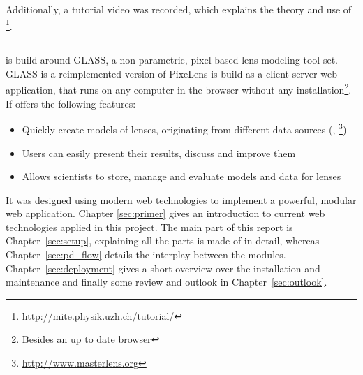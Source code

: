 Additionally, a tutorial video was recorded, which explains the theory and use of \spl\footnote{\protect\url{http://mite.physik.uzh.ch/tutorial/}}.



\subsection{\spl}

\spl is build around GLASS\cite{glass-jc}, a non parametric, pixel based lens modeling tool set.
GLASS is a reimplemented version of PixeLens\cite{pixelens}
%
\spl is build as a client-server web application, that runs on any computer in the browser without any installation\footnote{Besides an up to date browser}.
If offers the following features:
\begin{itemize}
  \item Quickly create models of lenses, originating from different data sources (\sw, \ml \footnote{\protect\url{http://www.masterlens.org}})
  \item Users can easily present their results, discuss and improve them
  \item Allows scientists to store, manage and evaluate models and data for lenses
\end{itemize}

It was designed using modern web technologies to implement a powerful, modular web application.
Chapter \ref{sec:primer} gives an introduction to current web technologies applied in this project.
The main part of this report is Chapter~\ref{sec:setup}, explaining all the parts \spl is made of in detail, whereas Chapter~\ref{sec:pd_flow} details the interplay between the modules.
Chapter~\ref{sec:deployment} gives a short overview over the installation and maintenance and finally some review and outlook in Chapter~\ref{sec:outlook}.


